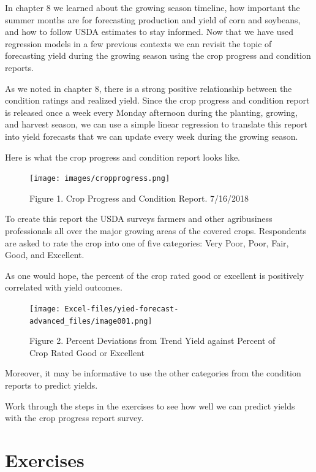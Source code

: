 \documentclass[
]{book}
\begin{document}
In chapter 8 we learned about the growing season timeline, how important the summer months are for forecasting production and yield of corn and soybeans, and how to follow USDA estimates to stay informed. Now that we have used regression models in a few previous contexts we can revisit the topic of forecasting yield during the growing season using the crop progress and condition reports.

As we noted in chapter 8, there is a strong positive relationship between the condition ratings and realized yield. Since the crop progress and condition report is released once a week every Monday afternoon during the planting, growing, and harvest season, we can use a simple linear regression to translate this report into yield forecasts that we can update every week during the growing season.

Here is what the crop progress and condition report looks like.

\begin{figure}
\centering
\texttt{[image: images/cropprogress.png]}
\caption{Figure 1. Crop Progress and Condition Report. 7/16/2018}
\end{figure}

To create this report the USDA surveys farmers and other agribusiness professionals all over the major growing areas of the covered crops. Respondents are asked to rate the crop into one of five categories: Very Poor, Poor, Fair, Good, and Excellent.

As one would hope, the percent of the crop rated good or excellent is positively correlated with yield outcomes.

\begin{figure}
\centering
\texttt{[image: Excel-files/yied-forecast-advanced\_files/image001.png]}
\caption{Figure 2. Percent Deviations from Trend Yield against Percent of Crop Rated Good or Excellent}
\end{figure}

Moreover, it may be informative to use the other categories from the condition reports to predict yields.

Work through the steps in the exercises to see how well we can predict yields with the crop progress report survey.

\hypertarget{exercises-10}{%
\section{Exercises}\label{exercises-10}}
\end{document}
